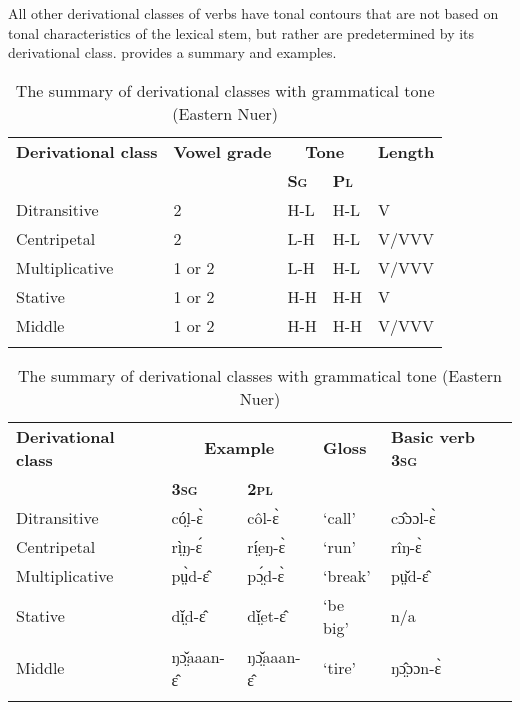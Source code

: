 \documentclass[output=paper,newtxmath,modfonts,nonflat,draftmode]{langsci/langscibook}
\begin{document}
\begin{table}
\caption{Examples of tonal classes of Antipassives and Intransitives (Eastern Nuer)}
\label{tab:monich:14}
\end{table}

\newpage 
All other derivational classes of verbs have tonal contours that are not based on tonal characteristics of the lexical stem, but rather are predetermined by its derivational class.  provides a summary and examples.

\begin{table}
\begin{tabularx}{\textwidth}{p{45mm}p{30mm}@{}Xll}
\lsptoprule

\bfseries Derivational class & \bfseries Vowel grade & \multicolumn{2}{c}{\bfseries Tone} & {\bfseries Length}\\
&  & \bfseries\scshape Sg & {\bfseries\scshape Pl} &\\
\midrule
Ditransitive & 2 & H-L & H-L & V\\
Centripetal & 2 & L-H & H-L & V/VVV\\
Multiplicative & 1 or 2 & L-H & H-L & V/VVV\\
Stative & 1 or 2 & H-H & H-H & V\\
Middle & 1 or 2 & H-H & H-H & V/VVV\\
\lspbottomrule
\end{tabularx}
\begin{tabularx}{\textwidth}{p{45mm}llll}
\bfseries Derivational class & \multicolumn{2}{c}{\bfseries Example} & \bfseries Gloss & {\bfseries Basic  verb 3\textsc{sg}} \\
& \bfseries\scshape 3sg & {\bfseries\scshape 2pl} &  & \\
\midrule
Ditransitive & có̤l-ɛ̀ & côl-ɛ̀ & ‘call’ & cɔ̂ɔɔl-ɛ̀\\
Centripetal & rì̤ŋ-ɛ́ & rí̤eŋ-ɛ̀& ‘run’ & rîŋ-ɛ̀\\
Multiplicative & pṳ̀d-ɛ̂ & pɔ̤́d-ɛ̀ & ‘break’ & pṳ̌d-ɛ̂\\
Stative & dǐ̤d-ɛ̂ & dǐ̤et-ɛ̂ & ‘be big’ & n/a\\
Middle & ŋɔ̤̌aaan-ɛ̂ & ŋɔ̤̌aaan-ɛ̂ & ‘tire’ & ŋɔ̤̂ɔɔn-ɛ̀\\
\lspbottomrule
\end{tabularx}
\caption{The summary of derivational classes with grammatical tone (Eastern Nuer)}
\label{tab:monich:15}
\end{table}
\end{document}

